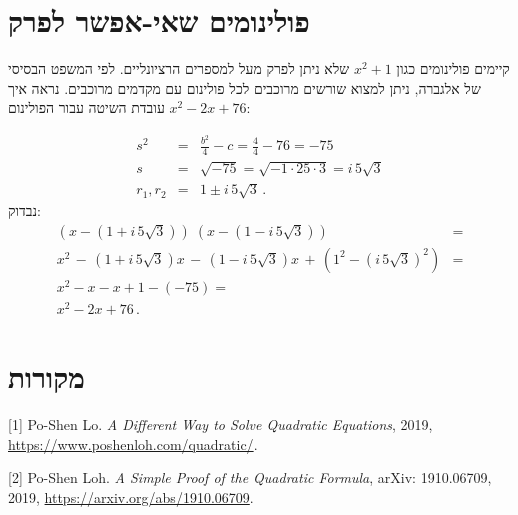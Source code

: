 \documentclass[12pt,a4paper]{article}
\begin{document}
\section{פולינומים שאי-אפשר לפרק}\label{s.irreducible}

קיימים פולינומים כגון
$x^2+1$
שלא ניתן לפרק מעל למספרים הרציונליים. לפי המשפט הבסיסי של אלגברה, ניתן למצוא שורשים מרוכבים לכל פולינום עם מקדמים מרוכבים. נראה איך עובדת השיטה עבור הפולינום
$x^2-2x+76$:

\begin{eqnarray*}
s^2&=&\frac{b^2}{4}-c=\frac{4}{4}-76=-75\\
s&=&\sqrt{-75}=\sqrt{-1\cdot 25\cdot 3}=i\,5\sqrt{3}\\
r_1,r_2&=&1\pm i\,5\sqrt{3}\,.
\end{eqnarray*}
נבדוק:
\[
\renewcommand*{\arraystretch}{1.3}
\begin{array}{ll}
(x-(1+i\,5\sqrt{3}))\;(x-(1-i\,5\sqrt{3}))&=\\
x^2 \,-\, (1+i\,5\sqrt{3})x\,-\,(1-i\,5\sqrt{3})x\,+\,(1^2-(i\,5\sqrt{3})^2)&=\\
x^2 -x -x + 1 - (-75)=\\
x^2-2x+76\,.
\end{array}
\]

\section*{מקורות}

[1] Po-Shen Lo. \textit{A Different Way to Solve Quadratic Equations}, 2019,\\
\url{https://www.poshenloh.com/quadratic/}.

[2] Po-Shen Loh. \textit{A Simple Proof of the Quadratic Formula}, arXiv: 1910.06709, 2019, \url{https://arxiv.org/abs/1910.06709}.
\end{document}
